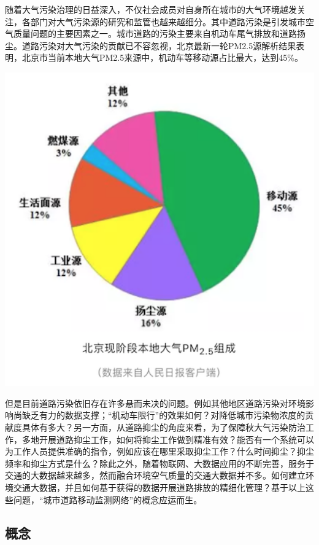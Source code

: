 \documentclass[
]{book}
\begin{document}
随着大气污染治理的日益深入，不仅社会成员对自身所在城市的大气环境越发关注，各部门对大气污染源的研究和监管也越来越细分。其中道路污染是引发城市空气质量问题的主要因素之一。城市道路的污染主要来自机动车尾气排放和道路扬尘。道路污染对大气污染的贡献已不容忽视，北京最新一轮PM2.5源解析结果表明，北京市当前本地大气PM2.5来源中，机动车等移动源占比最大，达到45\%。

\includegraphics[width=5.56in]{images/dlyd1}

但是目前道路污染依旧存在许多悬而未决的问题。例如其他地区道路污染对环境影响尚缺乏有力的数据支撑；``机动车限行''的效果如何？对降低城市污染物浓度的贡献度具体有多大？另一方面，从道路抑尘的角度来看，为了保障秋大气污染防治工作，多地开展道路抑尘工作，如何将抑尘工作做到精准有效？能否有一个系统可以为工作人员提供准确的指令，例如应该在哪里采取抑尘工作？什么时间抑尘？抑尘频率和抑尘方式是什么？除此之外，随着物联网、大数据应用的不断完善，服务于交通的大数据越来越多，然而融合环境空气质量的交通大数据并不多。如何建立环境交通大数据，并且如何基于获得的数据开展道路排放的精细化管理？基于以上这些问题，``城市道路移动监测网络''的概念应运而生。

\hypertarget{ux6982ux5ff5}{%
\subsection{概念}\label{ux6982ux5ff5}}
\end{document}
